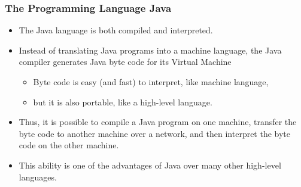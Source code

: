 \begin{frame}
\frametitle{The Programming Language Java}
\begin{itemize}
\item The Java language is both compiled and
interpreted.  
\item Instead of translating Java programs into a 
machine language, the Java compiler generates Java byte code for its \alert{Virtual Machine}
\begin{itemize}
\item Byte code is easy (and fast) to interpret, like machine language,
\item but it is also portable, like a high-level language.  
\end{itemize}
\item Thus, it is possible to compile a Java program on one machine,
transfer the byte code to another machine over a network,
and then interpret the byte code on the other machine.  
\item This ability is one of the advantages of Java over many other
high-level languages.
\end{itemize}
\end{frame}

